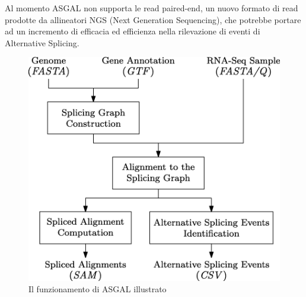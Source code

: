 Al momento ASGAL non supporta le read paired-end, un nuovo formato di read prodotte da allineatori NGS (Next Generation Sequencing), che potrebbe portare ad un incremento di efficacia ed efficienza nella rilevazione di eventi di Alternative Splicing. 


\begin{figure}[h!]
	\includegraphics[width=\textwidth]{images/asgal.png}
  \caption{Il funzionamento di ASGAL illustrato}
  \label{fig:ASGAL}
\end{figure}
